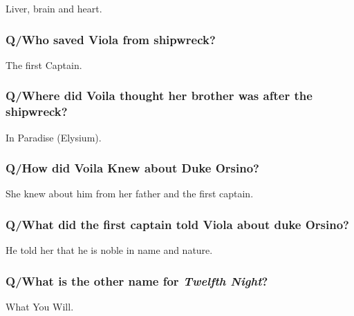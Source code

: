 \documentclass[12pt, a4paper]{article}
\begin{document}
Liver, brain and heart.

\subsubsection*{Q/Who saved Viola from shipwreck?}

The first Captain.

\subsubsection*{Q/Where did Voila thought her brother was after the shipwreck?}

In Paradise (Elysium).

\subsubsection*{Q/How did Voila Knew about Duke Orsino?}

She knew about him from her father and the first captain.

\subsubsection*{Q/What did the first captain told Viola about duke Orsino?}

He told her that he is noble in name and nature.

\subsubsection*{Q/What is the other name for \textit{Twelfth Night}?}

What You Will.
\end{document}
